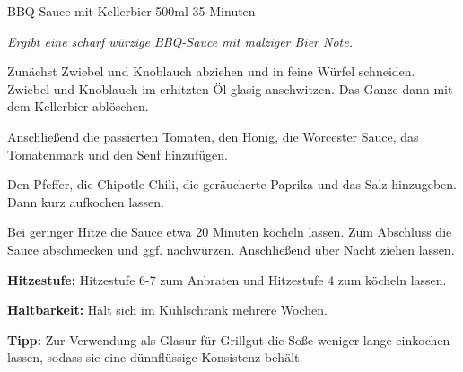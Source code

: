 \begin{recipe}{BBQ-Sauce mit Kellerbier} {500ml} {35 Minuten}

\freeform
\textit{Ergibt eine scharf würzige BBQ-Sauce mit malziger Bier Note.}


Zunächst Zwiebel und Knoblauch abziehen und in feine Würfel schneiden.
Zwiebel und Knoblauch im erhitzten Öl glasig anschwitzen.
Das Ganze dann mit dem Kellerbier ablöschen.


Anschließend die passierten Tomaten, den Honig, die Worcester Sauce, das Tomatenmark und den Senf hinzufügen.


Den Pfeffer, die Chipotle Chili, die geräucherte Paprika und das Salz hinzugeben.
Dann kurz aufkochen lassen.

\newstep
Bei geringer Hitze die Sauce etwa 20 Minuten köcheln lassen.
Zum Abschluss die Sauce abschmecken und ggf. nachwürzen.
Anschließend über Nacht ziehen lassen.

\freeform
\hrulefill

\freeform 
\textbf{Hitzestufe:}
Hitzestufe 6-7 zum Anbraten und Hitzestufe 4 zum köcheln lassen.

\freeform 
\textbf{Haltbarkeit:}
Hält sich im Kühlschrank mehrere Wochen.

\freeform 
\textbf{Tipp:}
Zur Verwendung als Glasur für Grillgut die Soße weniger lange einkochen lassen, sodass sie eine dünnflüssige Konsistenz behält.

\end{recipe}
